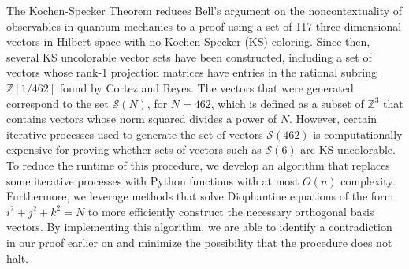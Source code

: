 \documentclass[11pt]{article}
\begin{document}
\pagestyle{fancy}

\lfoot{} 
\rfoot{}
	The Kochen-Specker Theorem reduces Bell’s argument on the noncontextuality of observables in quantum mechanics to a proof using a set of 117-three dimensional vectors in Hilbert space with no Kochen-Specker (KS) coloring. Since then, several KS uncolorable vector sets have been constructed, including a set of vectors whose rank-1 projection matrices have entries in the rational subring $\mathbb{Z}[1/462]$ found by Cortez and Reyes. The vectors that were generated correspond to the set $\mathcal{S}(N)$, for $N = 462$, which is defined as a subset of $\mathbb{Z}^{3}$ that contains vectors whose norm squared divides a power of $N$. However, certain iterative processes used to generate the set of vectors $\mathcal{S}(462)$ is computationally expensive for proving whether sets of vectors such as $\mathcal{S}(6)$ are KS uncolorable. To reduce the runtime of this procedure, we develop an algorithm that replaces some iterative processes with Python functions with at most $O(n)$ complexity. Furthermore, we leverage methods that solve Diophantine equations of the form $i^{2} + j^{2} + k^{2} = N$ to more efficiently construct the necessary orthogonal basis vectors. By implementing this algorithm, we are able to identify a contradiction in our proof earlier on and minimize the possibility that the procedure does not halt.
\end{document}
